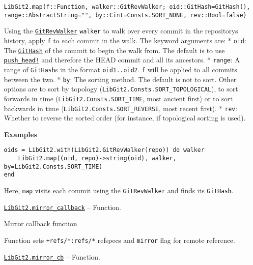 \begin{adjustwidth}{2em}{0pt}


\begin{verbatim}
LibGit2.map(f::Function, walker::GitRevWalker; oid::GitHash=GitHash(), range::AbstractString="", by::Cint=Consts.SORT_NONE, rev::Bool=false)
\end{verbatim}

Using the \hyperlink{7800294839307043628}{\texttt{GitRevWalker}} \texttt{walker} to {\textquotedbl}walk{\textquotedbl} over every commit in the repository{\textquotesingle}s history, apply \texttt{f} to each commit in the walk. The keyword arguments are:     * \texttt{oid}: The \hyperlink{202290709580230708}{\texttt{GitHash}} of the commit to begin the walk from. The default is to use       \hyperlink{9792433728015067335}{\texttt{push\_head!}} and therefore the HEAD commit and all its ancestors.     * \texttt{range}: A range of \texttt{GitHash}s in the format \texttt{oid1..oid2}. \texttt{f} will be       applied to all commits between the two.     * \texttt{by}: The sorting method. The default is not to sort. Other options are to sort by       topology (\texttt{LibGit2.Consts.SORT\_TOPOLOGICAL}), to sort forwards in time       (\texttt{LibGit2.Consts.SORT\_TIME}, most ancient first) or to sort backwards in time       (\texttt{LibGit2.Consts.SORT\_REVERSE}, most recent first).     * \texttt{rev}: Whether to reverse the sorted order (for instance, if topological sorting is used).

\textbf{Examples}


\begin{verbatim}
oids = LibGit2.with(LibGit2.GitRevWalker(repo)) do walker
    LibGit2.map((oid, repo)->string(oid), walker, by=LibGit2.Consts.SORT_TIME)
end
\end{verbatim}

Here, \texttt{map} visits each commit using the \texttt{GitRevWalker} and finds its \texttt{GitHash}.



\end{adjustwidth}
\hypertarget{3649636619945218341}{}
\hyperlink{3649636619945218341}{\texttt{LibGit2.mirror\_callback}}  -- {Function.}

\begin{adjustwidth}{2em}{0pt}

Mirror callback function

Function sets \texttt{+refs/*:refs/*} refspecs and \texttt{mirror} flag for remote reference.



\end{adjustwidth}
\hypertarget{381062800465562522}{}
\hyperlink{381062800465562522}{\texttt{LibGit2.mirror\_cb}}  -- {Function.}


